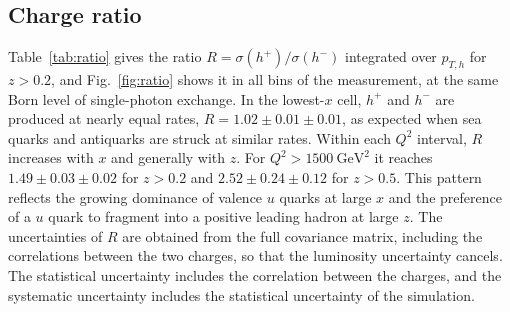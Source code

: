 \documentclass[11pt,a4paper]{article}
\newcommand{\Qsq}{Q^{2}}
\newcommand{\pTh}{p_{T,h}}
\newcommand{\hplus}{h^{+}}
\newcommand{\hminus}{h^{-}}
\newcommand{\GeVsq}{\mathrm{GeV}^{2}}
\begin{document}
\subsection{Charge ratio}

Table~\ref{tab:ratio} gives the ratio $R=\sigma(\hplus)/\sigma(\hminus)$ integrated over $\pTh$ for $z>0.2$, and Fig.~\ref{fig:ratio} shows it in all bins of the measurement, at the same Born level of single-photon exchange. In the lowest-$x$ cell, $\hplus$ and $\hminus$ are produced at nearly equal rates, $R=1.02\pm0.01\pm0.01$, as expected when sea quarks and antiquarks are struck at similar rates. Within each $\Qsq$ interval, $R$ increases with $x$ and generally with $z$. For $\Qsq>1500~\GeVsq$ it reaches $1.49\pm0.03\pm0.02$ for $z>0.2$ and $2.52\pm0.24\pm0.12$ for $z>0.5$. This pattern reflects the growing dominance of valence $u$ quarks at large $x$ and the preference of a $u$ quark to fragment into a positive leading hadron at large $z$. The uncertainties of $R$ are obtained from the full covariance matrix, including the correlations between the two charges, so that the luminosity uncertainty cancels. The statistical uncertainty includes the correlation between the charges, and the systematic uncertainty includes the statistical uncertainty of the simulation.
\end{document}
